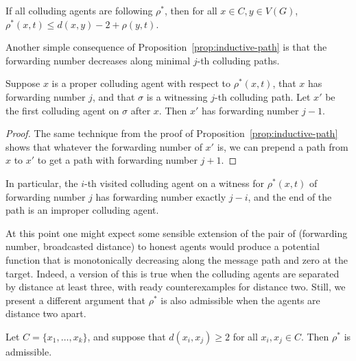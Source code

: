 \documentclass{comnet}
\begin{document}
\begin{corollary} \label{cor:rhostar-bound}

If all colluding agents are following $\rho^*$, then for all $x \in C, y \in
V(G)$, $\rho^*(x,t) \leq d(x,y) - 2 + \rho(y,t)$.

\end{corollary}

Another simple consequence of Proposition~\ref{prop:inductive-path} is that the
forwarding number decreases along minimal $j$-th colluding paths.

\begin{proposition} \label{prop:inductive-forwarding-number}

Suppose $x$ is a proper colluding agent with respect to $\rho^*(x,t)$, that $x$
has forwarding number $j$, and that $\sigma$ is a witnessing $j$-th colluding
path. Let $x'$ be the first colluding agent on $\sigma$ after $x$. Then $x'$
has forwarding number $j-1$.  

\end{proposition}

\begin{proof}

The same technique from the proof of Proposition~\ref{prop:inductive-path}
shows that whatever the forwarding number of $x'$ is, we can prepend a path from
$x$ to $x'$ to get a path with forwarding number $j+1$.
\end{proof}

In particular, the $i$-th visited colluding agent on a witness for
$\rho^*(x,t)$ of forwarding number $j$ has forwarding number exactly $j - i$,
and the end of the path is an improper colluding agent.

At this point one might expect some sensible extension of the pair of
(forwarding number, broadcasted distance) to honest agents would produce a
potential function that is monotonically decreasing along the message path and
zero at the target. Indeed, a version of this is true when the colluding agents
are separated by distance at least three, with ready counterexamples for
distance two. Still, we present a different argument that $\rho^*$ is also
admissible when the agents are distance two apart.
 
\begin{proposition} \label{prop:rhostar-admissible}

Let $C = \{ x_1, \dots, x_k \}$, and suppose that $d(x_i, x_j) \geq 2$ for all
$x_i, x_j \in C$. Then $\rho^*$ is admissible.

\end{proposition}
\end{document}
